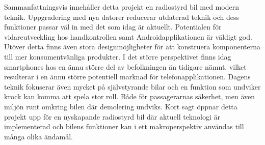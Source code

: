 \documentclass[a4paper]{article}
\begin{document}




\vspace{5mm} \noindent
Sammanfattningsvis innehåller detta projekt en radiostyrd bil med modern teknik. Uppgradering med nya datorer reducerar utdaterad teknik och dess funktioner passar väl in med det som idag är aktuellt. Potentialen för vidareutveckling hos handkontrollen samt Androidapplikationen är väldigt god. Utöver detta finns även stora designmöjligheter för att konstruera komponenterna till mer konsumentvänliga produkter. I det större perspektivet finns idag smartphones hos en ännu större del av befolkningen än tidigare nämnt, vilket resulterar i en ännu större potentiell marknad för telefonapplikationen. Dagens teknik fokuserar även mycket på självstyrande bilar och en funktion som undviker krock kan komma att spela stor roll. Både för passagerarnas säkerhet, men även miljön runt omkring bilen där demolering undviks. Kort sagt öppnar detta projekt upp för en nyskapande radiostyrd bil där aktuell teknologi är implementerad och bilens funktioner kan i ett makroperspektiv användas till många olika ändamål.





\newpage

\end{document}
